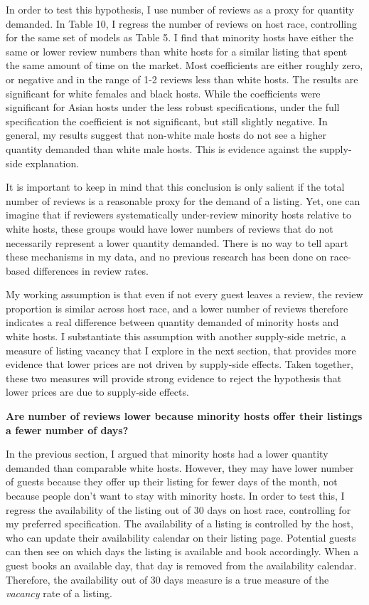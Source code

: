 In order to test this hypothesis, I use number of reviews as a proxy for quantity demanded. In Table 10, I regress the number of reviews on host race, controlling for the same set of models as Table 5. I find that minority hosts have either the same or lower review numbers than white hosts for a similar listing that spent the same amount of time on the market. Most coefficients are either roughly zero, or negative and in the range of 1-2 reviews less than white hosts. The results are significant for white females and black hosts. While the coefficients were significant for Asian hosts under the less robust specifications, under the full specification the coefficient is not significant, but still slightly negative. In general, my results suggest that non-white male hosts do not see a higher quantity demanded than white male hosts. This is evidence against the supply-side explanation. 

It is important to keep in mind that this conclusion is only salient if the total number of reviews is a reasonable proxy for the demand of a listing. Yet, one can imagine that if reviewers systematically under-review minority hosts relative to white hosts, these groups would have lower numbers of reviews that do not necessarily represent a lower quantity demanded. There is no way to tell apart these mechanisms in my data, and no previous research has been done on race-based differences in review rates. 

My working assumption is that even if not every guest leaves a review, the review proportion is similar across host race, and a lower number of reviews therefore indicates a real difference between quantity demanded of minority hosts and white hosts. I substantiate this assumption with another supply-side metric, a measure of listing vacancy that I explore in the next section, that provides more evidence that lower prices are not driven by supply-side effects. Taken together, these two measures will provide strong evidence to reject the hypothesis that lower prices are due to supply-side effects. 


\textbf{Are number of reviews lower because minority hosts offer their listings a fewer number of days?}

In the previous section, I argued that minority hosts had a lower quantity demanded than comparable white hosts. However, they may have lower number of guests because they offer up their listing for fewer days of the month, not because people don't want to stay with minority hosts. In order to test this, I regress the availability of the listing out of 30 days on host race, controlling for my preferred specification. The availability of a listing is controlled by the host, who can update their availability calendar on their listing page. Potential guests can then see on which days the listing is available and book accordingly. When a guest books an available day, that day is removed from the availability calendar. Therefore, the availability out of 30 days measure is a true measure of the \textit{vacancy} rate of a listing.

